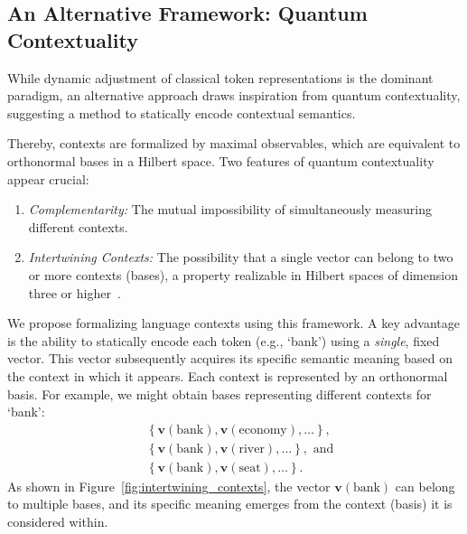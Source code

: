 \documentclass[%
  reprint,
  superscriptaddress,
  showpacs,
  showkeys,
  amsmath,amssymb,
  pra,
  longbibliography,
  floatfix,
  x11names
]{revtex4-2}
\begin{document}
\subsection{An Alternative Framework: Quantum Contextuality}

While dynamic adjustment of classical token representations is the dominant paradigm,
an alternative approach draws inspiration from quantum contextuality,
suggesting a method to statically encode contextual semantics.

Thereby, contexts are formalized by maximal observables,
which are equivalent to orthonormal bases in a Hilbert space.
Two features of quantum contextuality appear crucial:
\begin{enumerate}
    \item \textit{Complementarity:} The mutual impossibility of simultaneously measuring different contexts.
    \item \textit{Intertwining Contexts:}
The possibility that a single vector can belong to two or more contexts (bases),
a property realizable in Hilbert spaces of dimension three or higher~\cite{Gleason}.
\end{enumerate}

We propose formalizing language contexts using this framework.
A key advantage is the ability to statically encode each token (e.g., `bank') using a
\textit{single}, fixed vector. This vector subsequently acquires its specific
semantic meaning based on the context in which it appears.
Each context is represented by an orthonormal basis.
For example, we might obtain bases representing different contexts for `bank':
\begin{align*} %
& \left\{ \bm{v}(\text{bank}), \bm{v}(\text{economy}), \ldots \right\} , \\
& \left\{ \bm{v}(\text{bank}), \bm{v}(\text{river}), \ldots \right\} , \text{ and} \\
& \left\{ \bm{v}(\text{bank}), \bm{v}(\text{seat}), \ldots \right\} .
\end{align*}
As shown in Figure~\ref{fig:intertwining_contexts}, the vector $\bm{v}(\text{bank})$
can belong to multiple bases, and its specific meaning emerges from the context (basis) it is considered within.
\end{document}
